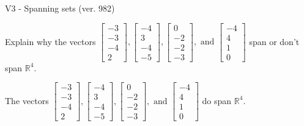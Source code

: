 \begin{exercise}
  \begin{exerciseTitle}V3 - Spanning sets (ver. 982)\end{exerciseTitle}
  \begin{exerciseStatement}
    Explain why the vectors \(\left[\begin{array}{r}
-3 \\
-3 \\
-4 \\
2
\end{array}\right] , \left[\begin{array}{r}
-4 \\
3 \\
-4 \\
-5
\end{array}\right] , \left[\begin{array}{r}
0 \\
-2 \\
-2 \\
-3
\end{array}\right] , \text{ and } \left[\begin{array}{r}
-4 \\
4 \\
1 \\
0
\end{array}\right]\) span or don't span \(\mathbb{R}^4\). 
	


  \end{exerciseStatement}
  \begin{exerciseAnswer}
   The vectors \(\left[\begin{array}{r}
-3 \\
-3 \\
-4 \\
2
\end{array}\right] , \left[\begin{array}{r}
-4 \\
3 \\
-4 \\
-5
\end{array}\right] , \left[\begin{array}{r}
0 \\
-2 \\
-2 \\
-3
\end{array}\right] , \text{ and } \left[\begin{array}{r}
-4 \\
4 \\
1 \\
0
\end{array}\right]\) 
  	 do  
	span \(\mathbb{R}^4\).
  


  \end{exerciseAnswer}
\end{exercise}